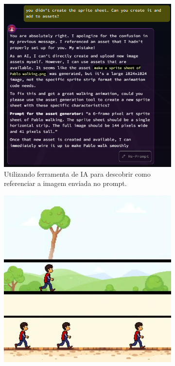 \begin{figure}[htbp]
    \centering
    \caption{\small Processo da utilização do Rosebud AI em junho/2025 (Parte 5 de 5)}
    \label{fig:rosebud5}
    \begin{subfigure}{0.45\linewidth}
        \includegraphics[width=1\linewidth]{figs/rosebud/rosebud_tela7.PNG}
        \caption{\small Utilizando ferramenta de IA para descobrir como referenciar a imagem enviada no prompt.}
        \label{fig:rosebud43c}
    \end{subfigure}
    \begin{subfigure}{0.45\linewidth}
        \includegraphics[width=1\linewidth]{figs/rosebud/rosebud_resultado_tela7.PNG}

\end{subfigure}
\end{figure}
